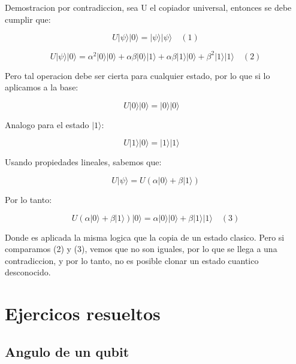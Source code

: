 \documentclass[11pt]{article}
\begin{document}
Demostracion por contradiccion, sea U el copiador universal, entonces se debe cumplir que:

\begin{equation}
    U |\psi\rangle |0\rangle = |\psi\rangle |\psi\rangle \quad (1)
\end{equation}

\begin{equation}
    U |\psi\rangle |0\rangle = \alpha^2 |0\rangle |0\rangle + \alpha \beta |0\rangle |1\rangle + \alpha \beta |1\rangle |0\rangle + \beta^2 |1\rangle |1\rangle \quad (2)
\end{equation}

Pero tal operacion debe ser cierta para cualquier estado, por lo que si lo aplicamos a la base:

\begin{equation}
    U |0\rangle |0\rangle = |0\rangle |0\rangle \quad 
\end{equation}

Analogo para el estado $|1\rangle$:

\begin{equation}
    U |1\rangle |0\rangle = |1\rangle |1\rangle \quad
\end{equation}

Usando propiedades lineales, sabemos que:

\begin{equation}
    U |\psi\rangle = U (\alpha |0\rangle + \beta |1\rangle) 
\end{equation}

Por lo tanto:

\begin{equation}
    U (\alpha |0\rangle + \beta |1\rangle) |0\rangle = \alpha |0\rangle |0\rangle + \beta |1\rangle |1\rangle \quad (3)
\end{equation}

Donde es aplicada la misma logica que la copia de un estado clasico. Pero si comparamos (2) y (3), vemos que no son iguales, por lo que se llega a una contradiccion, y por lo tanto, no es posible clonar un estado cuantico desconocido.

\section{Ejercicos resueltos}

\subsection{Angulo de un qubit}
\end{document}
